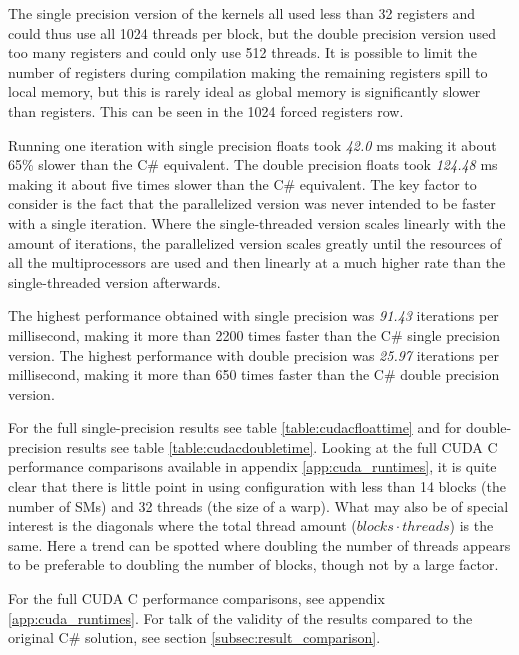 The single precision version of the kernels all used less than 32 registers and could thus use all 1024 threads per block, but the double precision version used too many registers and could only use 512 threads. 
It is possible to limit the number of registers during compilation making the remaining registers spill to local memory, but this is rarely ideal as global memory is significantly slower than registers.
This can be seen in the 1024 forced registers row.

Running one iteration with single precision floats took \emph{42.0} ms making it about 65\% slower than the C\# equivalent.
The double precision floats took \emph{124.48} ms making it about five times slower than the C\# equivalent.
The key factor to consider is the fact that the parallelized version was never intended to be faster with a single iteration.
Where the single-threaded version scales linearly with the amount of iterations, the parallelized version scales greatly until the resources of all the multiprocessors are used and then linearly at a much higher rate than the single-threaded version afterwards.

The highest performance obtained with single precision was \emph{91.43} iterations per millisecond, making it more than 2200 times faster than the C\# single precision version.
The highest performance with double precision was \emph{25.97} iterations per millisecond, making it more than 650 times faster than the C\# double precision version.

For the full single-precision results see table \ref{table:cudacfloattime} and for double-precision results see table \ref{table:cudacdoubletime}.
Looking at the full CUDA C performance comparisons available in appendix \ref{app:cuda_runtimes}, it is quite clear that there is little point in using configuration with less than 14 blocks (the number of SMs) and 32 threads (the size of a warp).
What may also be of special interest is the diagonals where the total thread amount ($blocks \cdot threads$) is the same.
Here a trend can be spotted where doubling the number of threads appears to be preferable to doubling the number of blocks, though not by a large factor.

For the full CUDA C performance comparisons, see appendix \ref{app:cuda_runtimes}.
For talk of the validity of the results compared to the original C\# solution, see section \ref{subsec:result_comparison}.


